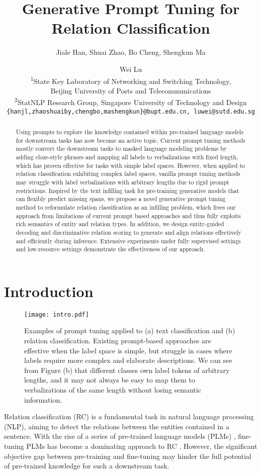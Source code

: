 \documentclass[11pt]{article}
\title{Generative Prompt Tuning for Relation Classification}
\author{
	Jiale Han, Shuai Zhao, Bo Cheng, Shengkun Ma \and Wei Lu
	\\
	\textsuperscript{1}State Key Laboratory of Networking and Switching Technology,\\Beijing University of Posts and Telecommunications\\
	\textsuperscript{2}StatNLP Research Group, Singapore University of Technology and Design\\
	\texttt{\{hanjl,zhaoshuaiby,chengbo,mashengkun\}@bupt.edu.cn, luwei@sutd.edu.sg}
}
\begin{document}
	\maketitle
	\begin{abstract}
		Using prompts to explore the knowledge contained within pre-trained language models for downstream tasks has now become an active topic. Current prompt tuning methods mostly convert the downstream tasks to masked language modeling problems by adding cloze-style phrases and mapping all labels to verbalizations with fixed length, which has proven effective for tasks with simple label spaces.
		However, when applied to relation classification exhibiting complex label spaces, vanilla prompt tuning methods may struggle with label verbalizations with arbitrary lengths due to rigid prompt restrictions.
		Inspired by the text infilling task for pre-training generative models that can flexibly predict missing spans, we propose a novel generative prompt tuning method to reformulate relation classification as an infilling problem, which frees our approach from limitations of current prompt based approaches and thus fully exploits rich semantics of entity and relation types.
		In addition, we design entity-guided decoding and discriminative relation scoring to generate and align relations effectively and efficiently during inference. Extensive experiments under fully supervised settings and low-resource settings demonstrate the effectiveness of our approach.
	\end{abstract}
	
	\section{Introduction}
	
	\begin{figure}[t!]
\centering
		\texttt{[image: intro.pdf]}
		\caption{Examples of prompt tuning applied to (a) text classification and (b) relation classification. Existing prompt-based approaches are effective when the label space is simple, but struggle in cases where labels require more complex and elaborate descriptions. We can see from Figure (b) that different classes own label tokens of arbitrary lengths, and it may not always be easy to map them to verbalizations of the same length without losing semantic information.}
		\label{intro} 
	\end{figure}
	Relation classification (RC) is a fundamental task in natural language processing (NLP), aiming to detect the relations between the entities contained in a sentence. With the rise of a series of pre-trained language models (PLMs) \cite{devlin-etal-2019-bert, DBLP:journals/corr/abs-1907-11692, lewis-etal-2020-bart, DBLP:journals/jmlr/RaffelSRLNMZLL20}, fine-tuning PLMs has become a dominating approach to RC \cite{joshi-etal-2020-spanbert, DBLP:conf/aaai/XueSZC21, DBLP:journals/corr/abs-2102-01373}. However, the significant objective gap between pre-training and fine-tuning may hinder the full potential of pre-trained knowledge for such a downstream task.
	
\end{document}
